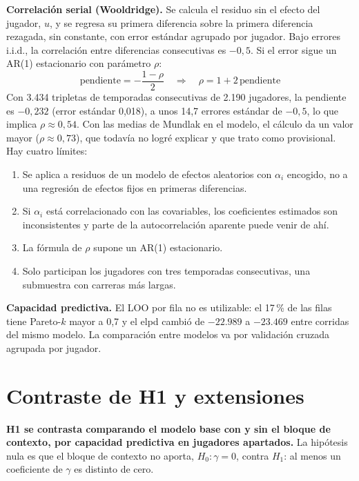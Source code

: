 \documentclass[11pt,a4paper]{article}
\newcommand{\lead}[1]{\textbf{#1}}
\begin{document}
\lead{Correlación serial (Wooldridge).} Se calcula el residuo sin el efecto del jugador, $u$, y se regresa su primera diferencia sobre la primera diferencia rezagada, sin constante, con error estándar agrupado por jugador. Bajo errores i.i.d., la correlación entre diferencias consecutivas es $-0{,}5$. Si el error sigue un AR(1) estacionario con parámetro $\rho$:
\begin{equation*}
\text{pendiente} = -\frac{1-\rho}{2} \quad\Rightarrow\quad \rho = 1 + 2\,\text{pendiente}
\end{equation*}
Con 3.434 tripletas de temporadas consecutivas de 2.190 jugadores, la pendiente es $-0{,}232$ (error estándar 0,018), a unos 14,7 errores estándar de $-0{,}5$, lo que implica $\rho \approx 0{,}54$. Con las medias de Mundlak en el modelo, el cálculo da un valor mayor ($\rho \approx 0{,}73$), que todavía no logré explicar y que trato como provisional. Hay cuatro límites:
\begin{enumerate}
  \item Se aplica a residuos de un modelo de efectos aleatorios con $\alpha_i$ encogido, no a una regresión de efectos fijos en primeras diferencias.
  \item Si $\alpha_i$ está correlacionado con las covariables, los coeficientes estimados son inconsistentes y parte de la autocorrelación aparente puede venir de ahí.
  \item La fórmula de $\rho$ supone un AR(1) estacionario.
  \item Solo participan los jugadores con tres temporadas consecutivas, una submuestra con carreras más largas.
\end{enumerate}

\lead{Capacidad predictiva.} El LOO por fila no es utilizable: el 17\,\% de las filas tiene Pareto-$k$ mayor a 0,7 y el elpd cambió de $-22.989$ a $-23.469$ entre corridas del mismo modelo. La comparación entre modelos va por validación cruzada agrupada por jugador.

\section{Contraste de H1 y extensiones}

\lead{H1 se contrasta comparando el modelo base con y sin el bloque de contexto, por capacidad predictiva en jugadores apartados.} La hipótesis nula es que el bloque de contexto no aporta, $H_0\colon \gamma = 0$, contra $H_1$: al menos un coeficiente de $\gamma$ es distinto de cero.
\end{document}
